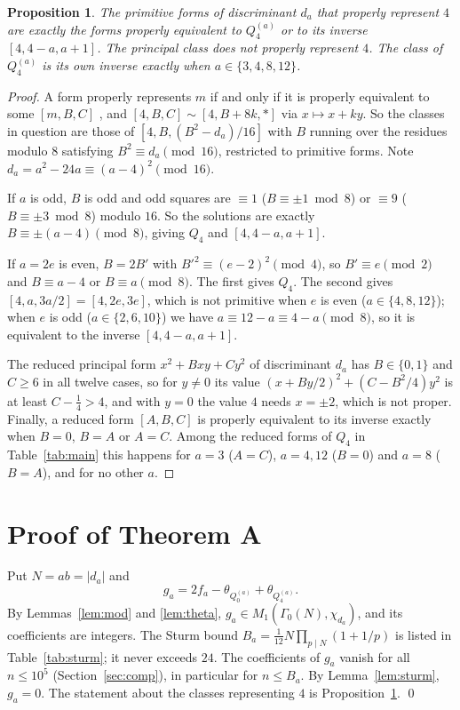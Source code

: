 \documentclass[11pt]{amsart}
\newtheorem{proposition}[lemma]{Proposition}
\theoremstyle{definition}
\theoremstyle{remark}
\newcommand{\form}[3]{[#1,#2,#3]}
\begin{document}
\begin{proposition}\label{prop:Q4}
The primitive forms of discriminant $d_a$ that properly represent $4$ are exactly the forms properly equivalent to $Q_4^{(a)}$ or to its inverse $\form{4}{4-a}{a+1}$. The principal class does not properly represent $4$. The class of $Q_4^{(a)}$ is its own inverse exactly when $a\in\{3,4,8,12\}$.
\end{proposition}

\begin{proof}
A form properly represents $m$ if and only if it is properly equivalent to some $\form{m}{B}{C}$ \cite[Lemma~2.3]{Cox}, and $\form{4}{B}{C}\sim\form{4}{B+8k}{*}$ via $x\mapsto x+ky$. So the classes in question are those of $\form{4}{B}{(B^2-d_a)/16}$ with $B$ running over the residues modulo $8$ satisfying $B^2\equiv d_a\pmod{16}$, restricted to primitive forms. Note $d_a=a^2-24a\equiv(a-4)^2\pmod{16}$.

If $a$ is odd, $B$ is odd and odd squares are $\equiv1$ ($B\equiv\pm1\bmod 8$) or $\equiv9$ ($B\equiv\pm3\bmod8$) modulo $16$. So the solutions are exactly $B\equiv\pm(a-4)\pmod 8$, giving $Q_4$ and $\form{4}{4-a}{a+1}$.

If $a=2e$ is even, $B=2B'$ with $B'^2\equiv(e-2)^2\pmod 4$, so $B'\equiv e\pmod 2$ and $B\equiv a-4$ or $B\equiv a\pmod 8$. The first gives $Q_4$. The second gives $\form{4}{a}{3a/2}=\form{4}{2e}{3e}$, which is not primitive when $e$ is even ($a\in\{4,8,12\}$); when $e$ is odd ($a\in\{2,6,10\}$) we have $a\equiv 12-a\equiv 4-a\pmod 8$, so it is equivalent to the inverse $\form{4}{4-a}{a+1}$.

The reduced principal form $x^2+Bxy+Cy^2$ of discriminant $d_a$ has $B\in\{0,1\}$ and $C\ge6$ in all twelve cases, so for $y\ne0$ its value $(x+By/2)^2+(C-B^2/4)y^2$ is at least $C-\frac14>4$, and with $y=0$ the value $4$ needs $x=\pm2$, which is not proper. Finally, a reduced form $\form{A}{B}{C}$ is properly equivalent to its inverse exactly when $B=0$, $B=A$ or $A=C$. Among the reduced forms of $Q_4$ in Table~\ref{tab:main} this happens for $a=3$ ($A=C$), $a=4,12$ ($B=0$) and $a=8$ ($B=A$), and for no other $a$.
\end{proof}

\section{Proof of Theorem A}\label{sec:proofA}

Put $N=ab=|d_a|$ and
\[
g_a=2f_a-\theta_{Q_0^{(a)}}+\theta_{Q_4^{(a)}} .
\]
By Lemmas~\ref{lem:mod} and \ref{lem:theta}, $g_a\in M_1(\Gamma_0(N),\chi_{d_a})$, and its coefficients are integers. The Sturm bound $B_a=\frac1{12}N\prod_{p\mid N}(1+1/p)$ is listed in Table~\ref{tab:sturm}; it never exceeds $24$. The coefficients of $g_a$ vanish for all $n\le 10^5$ (Section~\ref{sec:comp}), in particular for $n\le B_a$. By Lemma~\ref{lem:sturm}, $g_a=0$. The statement about the classes representing $4$ is Proposition~\ref{prop:Q4}. \qed
\end{document}
